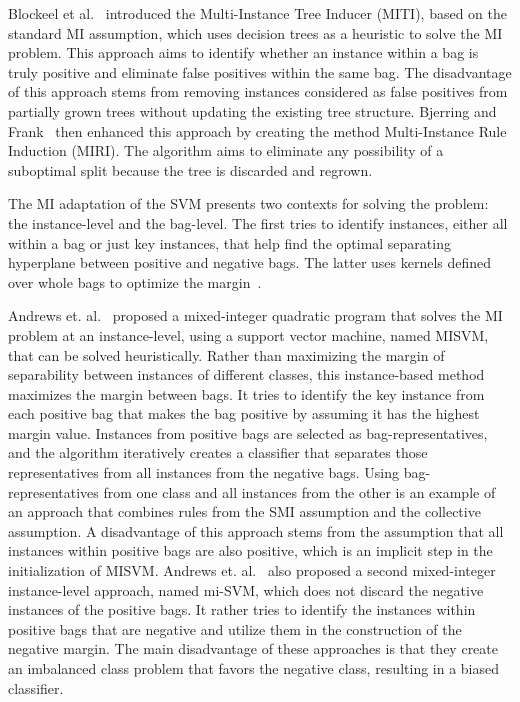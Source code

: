 \documentclass[reqno]{vcuthesis}
\numberwithin{equation}{chapter}
\begin{document}
Blockeel et al.~\cite{Blockeel2005} introduced the Multi-Instance Tree Inducer (MITI), based on the standard MI assumption, which uses decision trees as a heuristic to solve the MI problem. This approach aims to identify whether an instance within a bag is truly positive and eliminate false positives within the same bag. The disadvantage of this approach stems from removing instances considered as false positives from partially grown trees without updating the existing tree structure. Bjerring and Frank~\cite{Bjerring2011} then enhanced this approach by creating the method Multi-Instance Rule Induction (MIRI). The algorithm aims to eliminate any possibility of a suboptimal split because the tree is discarded and regrown. 

The MI adaptation of the SVM presents two contexts for solving the problem: the instance-level and the bag-level. The first tries to identify instances, either all within a bag or just key instances, that help find the optimal separating hyperplane between positive and negative bags. The latter uses kernels defined over whole bags to optimize the margin~\cite{Doran201479}. 

Andrews et. al.~\cite{Andrews2002} proposed a mixed-integer quadratic program that solves the MI problem at an instance-level, using a support vector machine, named MISVM, that can be solved heuristically. Rather than maximizing the margin of separability between instances of different classes, this instance-based method maximizes the margin between bags. It tries to identify the key instance from each positive bag that makes the bag positive by assuming it has the highest margin value. Instances from positive bags are selected as bag-representatives, and the algorithm iteratively creates a classifier that separates those representatives from all instances from the negative bags. Using bag-representatives from one class and all instances from the other is an example of an approach that combines rules from the SMI assumption and the collective assumption. A disadvantage of this approach stems from the assumption that all instances within positive bags are also positive, which is an implicit step in the initialization of MISVM. Andrews et. al.~\cite{Andrews2002} also proposed a second mixed-integer instance-level approach, named mi-SVM, which does not discard the negative instances of the positive bags. It rather tries to identify the instances within positive bags that are negative and utilize them in the construction of the negative margin. The main disadvantage of these approaches is that they create an imbalanced class problem that favors the negative class, resulting in a biased classifier.
\end{document}
